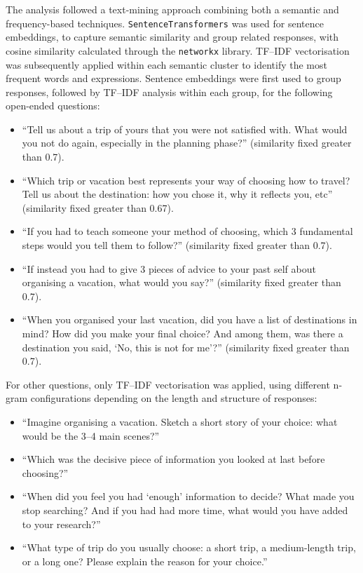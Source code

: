 \documentclass[a4paper, 12pt, twoside]{report}  %
\begin{document}
\indent The analysis followed a text-mining approach combining both a semantic and frequency-based techniques. \texttt{SentenceTransformers} was used for sentence embeddings, to capture semantic similarity and group related responses, with cosine similarity calculated through the \texttt{networkx} library. TF–IDF vectorisation was subsequently applied within each semantic cluster to identify the most frequent words and expressions. Sentence embeddings were first used to group responses, followed by TF–IDF analysis within each group, for the following open-ended questions:

\begin{itemize}
\item “Tell us about a trip of yours that you were not satisfied with. What would you not do again, especially in the planning phase?” (similarity fixed greater than 0.7).
\item “Which trip or vacation best represents your way of choosing how to travel? Tell us about the destination: how you chose it, why it reflects you, etc” (similarity fixed greater than 0.67).
\item “If you had to teach someone your method of choosing, which 3 fundamental steps would you tell them to follow?” (similarity fixed greater than 0.7).
\item “If instead you had to give 3 pieces of advice to your past self about organising a vacation, what would you say?” (similarity fixed greater than 0.7).
\item “When you organised your last vacation, did you have a list of destinations in mind? How did you make your final choice? And among them, was there a destination you said, ‘No, this is not for me’?” (similarity fixed greater than 0.7).
\end{itemize}

\indent For other questions, only TF–IDF vectorisation was applied, using different n-gram configurations depending on the length and structure of responses:

\begin{itemize}
\item “Imagine organising a vacation. Sketch a short story of your choice: what would be the 3–4 main scenes?”
\item “Which was the decisive piece of information you looked at last before choosing?”
\item “When did you feel you had ‘enough’ information to decide? What made you stop searching? And if you had had more time, what would you have added to your research?”
\item “What type of trip do you usually choose: a short trip, a medium-length trip, or a long one? Please explain the reason for your choice.”
\end{itemize}
\end{document}
